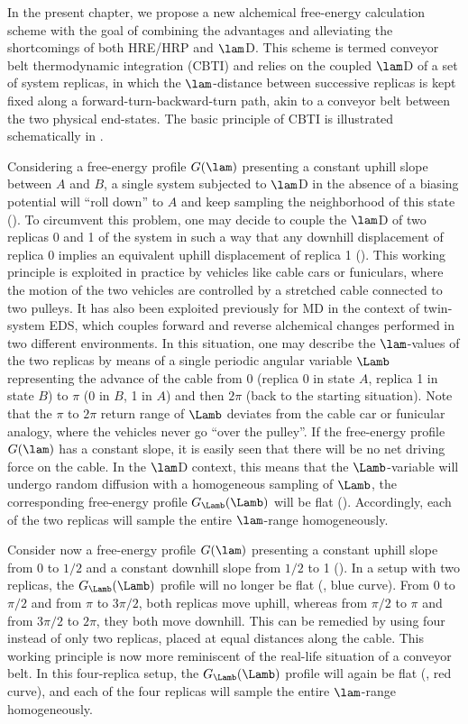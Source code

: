 In the present chapter, we propose a new alchemical free-energy calculation scheme with the goal of combining the advantages and alleviating the shortcomings of both HRE/HRP and $\lam$D. This scheme is termed conveyor belt thermodynamic integration (CBTI) and relies on the coupled $\lam$D of a set of system replicas, in which the $\lam$-distance between successive replicas is kept fixed along a forward-turn-backward-turn path, akin to a conveyor belt between the two physical end-states. The basic principle of CBTI is illustrated schematically in .


Considering a free-energy profile $G(\lam)$ presenting a constant uphill slope between $A$ and $B$, a single system subjected to $\lam$D in the absence of a biasing potential will ``roll down'' to $A$ and keep sampling the neighborhood of this state (). To circumvent this problem, one may decide to couple the $\lam$D of two replicas 0 and 1 of the system in such a way that any downhill displacement of replica 0 implies an equivalent uphill displacement of replica 1 (). This working principle is exploited in practice by vehicles like cable cars or funiculars, where the motion of the two vehicles are controlled by a stretched cable connected to two pulleys. It has also been exploited previously for MD in the context of twin-system\cite{HA13.1,GE16.1} EDS, which couples forward and reverse alchemical changes performed in two different environments. In this situation, one may describe the $\lam$-values of the two replicas by means of a single periodic angular variable $\Lamb$ representing the advance of the cable from 0 (replica 0 in state $A$, replica 1 in state $B$) to $\pi$ (0 in $B$, 1 in $A$) and then $2\pi$ (back to the starting situation). Note that the $\pi$ to $2\pi$ return range of $\Lamb$ deviates from the cable car or funicular analogy, where the vehicles never go ``over the pulley''. If the free-energy profile $G(\lam)$ has a constant slope, it is easily seen that there will be no net driving force on the cable. In the $\lam$D context, this means that the $\Lamb$-variable will undergo random diffusion with a homogeneous sampling of $\Lamb$, \ie{} the corresponding free-energy profile $G_{\Lamb}(\Lamb)$ will be flat (). Accordingly, each of the two replicas will sample the entire $\lam$-range homogeneously.


Consider now a free-energy profile $G(\lam)$ presenting a constant uphill slope from 0 to $1/2$ and a constant downhill slope from $1/2$ to 1 (). In a setup with two replicas, the $G_{\Lamb}(\Lamb)$ profile will no longer be flat (, blue curve). From 0 to $\pi/2$ and from $\pi$ to $3\pi/2$, both replicas move uphill, whereas from $\pi/2$ to $\pi$ and from $3\pi/2$ to $2\pi$, they both move downhill. This can be remedied by using four instead of only two replicas, placed at equal distances along the cable. This working principle is now more reminiscent of the real-life situation of a conveyor belt. In this four-replica setup, the $G_{\Lamb}(\Lamb)$ profile will again be flat (, red curve), and each of the four replicas will sample the entire $\lam$-range homogeneously.

